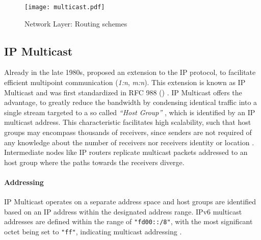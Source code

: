 \begin{figure}[h]
    \begin{center}
        \texttt{[image: multicast.pdf]}
    \end{center}
    \caption{Network Layer: Routing schemes}
    \label{fig:multicast}
\end{figure}

\subsection{IP Multicast} %
\label{sub:IP Multicast}
Already in the late 1980s, \citeauthor{deering1990multicast}
    \cite{deering1990multicast} proposed an extension to the IP protocol, to
    facilitate efficient multipoint communication (\textit{1:n}, \textit{m:n}).
This extension is known as IP Multicast and was first standardized in RFC 988
    (\citeyear{rfc988_initmc}) \cite{rfc988_initmc}.
IP Multicast offers the advantage, to greatly reduce the bandwidth by condensing
    identical traffic into a single stream targeted to a so called
    \textit{``Host Group''} \cite{rfc1112_ip4mc}, which is identified by an IP
    multicast address.
This characteristic facilitates high scalability, such that host groups may
    encompass thousands of receivers, since senders are not required of any
    knowledge about the number of receivers nor receivers identity or location
    \cite{cisco_ipmc}.
Intermediate nodes like IP routers replicate multicast packets addressed to an
    host group where the paths towards the receivers diverge.

\paragraph{Addressing} %
\label{par:Addressing}
IP Multicast operates on a separate address space and host groups are
    identified based on an IP address within the designated address range.
IPv6 multicast addresses are defined within the range of \texttt{"fd00::/8"},
    with the most significant octet being set to \texttt{"ff"}, indicating
    multicast addressing \cite{rfc4291_ip6mc}.

